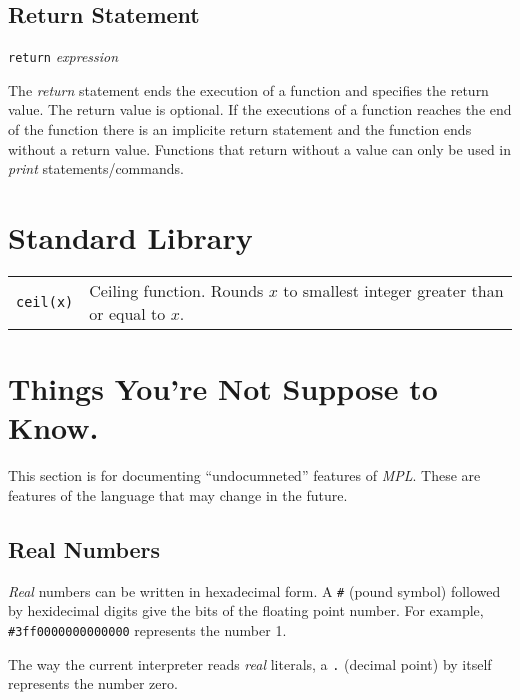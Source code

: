 \documentclass{article}
\begin{document}
\subsection{Return Statement}
\begin{center}
  \verb|return| \emph{expression}
\end{center}
The \emph{return} statement ends the execution of a function and specifies the return
value.
The return value is optional.
If the executions of a function reaches the end of the function there is an implicite return statement and the function ends without a return value.
Functions that return without a value can only be used in \emph{print} statements/commands.
\section{Standard Library}
\begin{tabular}{lp{8cm}}
  \verb|ceil(x)| & Ceiling function. Rounds $x$ to smallest integer greater than or equal to $x$. \\
\end{tabular}
\section{Things You're Not Suppose to Know.}
This section is for documenting ``undocumneted'' features of \emph{MPL}.
These are features of the language that may change in the future.
\subsection{Real Numbers}
\emph{Real} numbers can be written in hexadecimal form.
A \verb|#| (pound symbol) followed by hexidecimal digits give the bits
of the floating point number. For example, \verb|#3ff0000000000000|
represents the number 1.

The way the current interpreter reads \emph{real} literals,
a \verb|.| (decimal point) by itself represents the number
zero.
\end{document}
